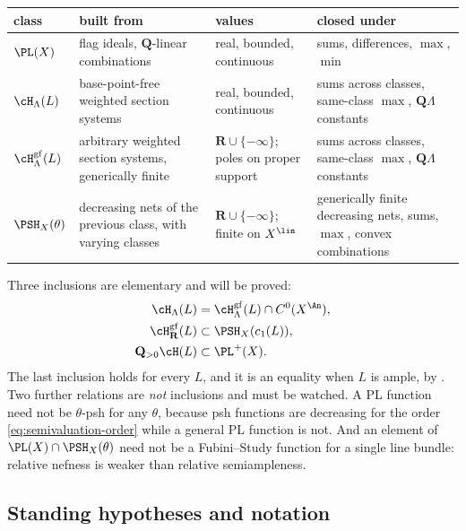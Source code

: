 \begin{center}
\small
\begin{tabular}{p{}|p{}|p{}|p{}}
\toprule
class & built from & values & closed under\\
\midrule
$\PL(X)$
 & flag ideals, $\mathbf Q$-linear combinations
 & real, bounded, continuous
 & sums, differences, $\max$, $\min$\\
$\cH_\Lambda(L)$
 & base-point-free weighted section systems
 & real, bounded, continuous
 & sums across classes, same-class $\max$, $\mathbf Q\Lambda$ constants\\
$\cH^{\mathrm{gf}}_\Lambda(L)$
 & arbitrary weighted section systems, generically finite
 & $\mathbf R\cup\{-\infty\}$; poles on proper support
 & sums across classes, same-class $\max$, $\mathbf Q\Lambda$ constants\\
$\PSH_X(\theta)$
 & decreasing nets of the previous class, with varying classes
 & $\mathbf R\cup\{-\infty\}$; finite on $X^{\lin}$
 & generically finite decreasing nets, sums, $\max$, convex combinations\\
\bottomrule
\end{tabular}
\end{center}

Three inclusions are elementary and will be proved:
\begin{equation}
\label{eq:ch34-hierarchy}
 \begin{aligned}
  \cH_\Lambda(L)
    &=\cH^{\mathrm{gf}}_\Lambda(L)\cap C^0(X^{\An}),\\
  \cH^{\mathrm{gf}}_{\mathbf R}(L)
    &\subset\PSH_X(c_1(L)),\\
  \mathbf Q_{>0}\cH(L)&\subset\PL^+(X).
 \end{aligned}
\end{equation}
The last inclusion holds for every $L$, and it is an equality when $L$
is ample, by \cite[Corollary~2.26]{BJ22}.  Two further relations are
\emph{not} inclusions and must be watched.  A PL function need not be
$\theta$-psh for any $\theta$, because psh functions are decreasing for
the order \eqref{eq:semivaluation-order} while a general PL function is not.
And an element of $\PL(X)\cap\PSH_X(\theta)$ need not be a Fubini--Study
function for a single line bundle: relative nefness is weaker than relative
semiampleness.

\subsection{Standing hypotheses and notation}
\label{sec:ch34-hypotheses}

